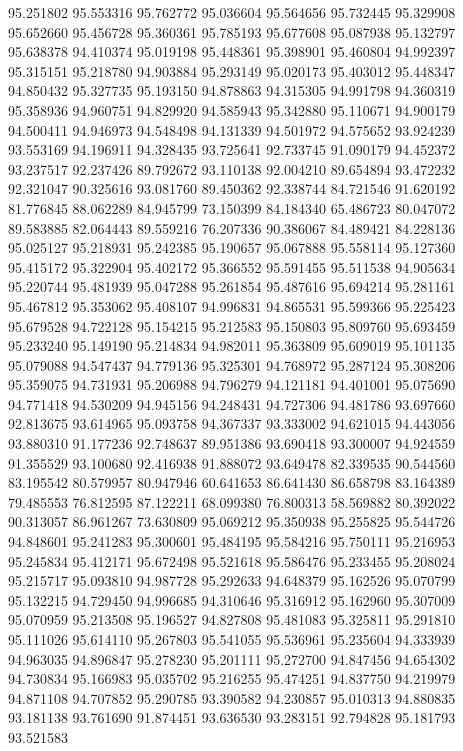 95.251802
95.553316
95.762772
95.036604
95.564656
95.732445
95.329908
95.652660
95.456728
95.360361
95.785193
95.677608
95.087938
95.132797
95.638378
94.410374
95.019198
95.448361
95.398901
95.460804
94.992397
95.315151
95.218780
94.903884
95.293149
95.020173
95.403012
95.448347
94.850432
95.327735
95.193150
94.878863
94.315305
94.991798
94.360319
95.358936
94.960751
94.829920
94.585943
95.342880
95.110671
94.900179
94.500411
94.946973
94.548498
94.131339
94.501972
94.575652
93.924239
93.553169
94.196911
94.328435
93.725641
92.733745
91.090179
94.452372
93.237517
92.237426
89.792672
93.110138
92.004210
89.654894
93.472232
92.321047
90.325616
93.081760
89.450362
92.338744
84.721546
91.620192
81.776845
88.062289
84.945799
73.150399
84.184340
65.486723
80.047072
89.583885
82.064443
89.559216
76.207336
90.386067
84.489421
84.228136
95.025127
95.218931
95.242385
95.190657
95.067888
95.558114
95.127360
95.415172
95.322904
95.402172
95.366552
95.591455
95.511538
94.905634
95.220744
95.481939
95.047288
95.261854
95.487616
95.694214
95.281161
95.467812
95.353062
95.408107
94.996831
94.865531
95.599366
95.225423
95.679528
94.722128
95.154215
95.212583
95.150803
95.809760
95.693459
95.233240
95.149190
95.214834
94.982011
95.363809
95.609019
95.101135
95.079088
94.547437
94.779136
95.325301
94.768972
95.287124
95.308206
95.359075
94.731931
95.206988
94.796279
94.121181
94.401001
95.075690
94.771418
94.530209
94.945156
94.248431
94.727306
94.481786
93.697660
92.813675
93.614965
95.093758
94.367337
93.333002
94.621015
94.443056
93.880310
91.177236
92.748637
89.951386
93.690418
93.300007
94.924559
91.355529
93.100680
92.416938
91.888072
93.649478
82.339535
90.544560
83.195542
80.579957
80.947946
60.641653
86.641430
86.658798
83.164389
79.485553
76.812595
87.122211
68.099380
76.800313
58.569882
80.392022
90.313057
86.961267
73.630809
95.069212
95.350938
95.255825
95.544726
94.848601
95.241283
95.300601
95.484195
95.584216
95.750111
95.216953
95.245834
95.412171
95.672498
95.521618
95.586476
95.233455
95.208024
95.215717
95.093810
94.987728
95.292633
94.648379
95.162526
95.070799
95.132215
94.729450
94.996685
94.310646
95.316912
95.162960
95.307009
95.070959
95.213508
95.196527
94.827808
95.481083
95.325811
95.291810
95.111026
95.614110
95.267803
95.541055
95.536961
95.235604
94.333939
94.963035
94.896847
95.278230
95.201111
95.272700
94.847456
94.654302
94.730834
95.166983
95.035702
95.216255
95.474251
94.837750
94.219979
94.871108
94.707852
95.290785
93.390582
94.230857
95.010313
94.880835
93.181138
93.761690
91.874451
93.636530
93.283151
92.794828
95.181793
93.521583
